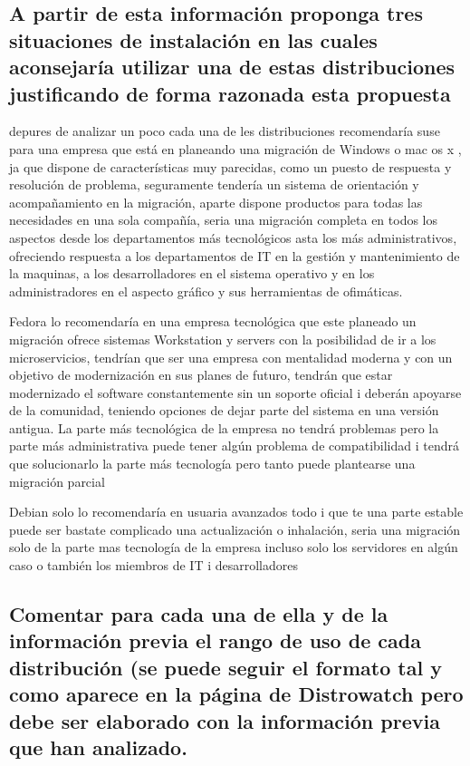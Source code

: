 \documentclass[preprint,11pt]{elsarticle}
\begin{document}
\subsection{A partir de esta información proponga tres situaciones de instalación en las cuales aconsejaría utilizar una de estas distribuciones justificando de forma razonada esta propuesta}\bigskip

depures de analizar un poco cada una de les distribuciones recomendaría suse para una empresa que está en planeando una migración de Windows o mac os x , ja que dispone de características muy parecidas, como un puesto de respuesta y resolución de problema, seguramente tendería un sistema de orientación y acompañamiento en la migración, aparte dispone productos para todas las necesidades en una sola compañía, seria una migración completa en todos los aspectos desde los departamentos más tecnológicos asta los más administrativos, ofreciendo respuesta a los departamentos de IT en la gestión y mantenimiento de la maquinas, a los desarrolladores en el sistema operativo y en los administradores en el aspecto gráfico y sus herramientas de ofimáticas.\bigskip

Fedora lo recomendaría en una empresa tecnológica que este planeado un migración ofrece sistemas Workstation y servers con la posibilidad de ir a los microservicios, tendrían que ser una empresa con mentalidad moderna y con un objetivo de modernización en sus planes de futuro, tendrán que estar modernizado el software constantemente sin un soporte oficial i deberán apoyarse de la comunidad, teniendo opciones de dejar parte del sistema en una versión antigua. La parte más tecnológica de la empresa no tendrá problemas pero la parte más administrativa puede tener algún problema de compatibilidad i tendrá que solucionarlo la parte más tecnología pero tanto puede plantearse una migración parcial\bigskip

Debian solo lo recomendaría en usuaria avanzados todo i que te una parte estable puede ser bastate complicado una actualización o inhalación, seria una migración solo de la parte mas tecnología de la empresa incluso solo los servidores en algún caso o también los miembros de IT i desarrolladores\bigskip

\subsection{ Comentar para cada una de ella y de la información previa el rango de uso de cada distribución (se puede seguir el formato tal y como aparece en la página de Distrowatch pero debe ser elaborado con la información previa que han analizado.}\bigskip
\end{document}
